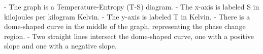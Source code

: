 - The graph is a Temperature-Entropy (T-S) diagram.
- The x-axis is labeled S in kilojoules per kilogram Kelvin.
- The y-axis is labeled T in Kelvin.
- There is a dome-shaped curve in the middle of the graph, representing the phase change region.
- Two straight lines intersect the dome-shaped curve, one with a positive slope and one with a negative slope.